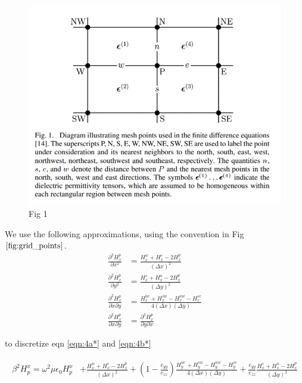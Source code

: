 \documentclass[letter]{article}
\newcommand{\Partialsqx}[1]{\frac{\partial^2 #1}{\partial x^2}}
\newcommand{\Partialsqy}[1]{\frac{\partial^2 #1}{\partial y^2}}
\begin{document}
	
	\begin{figure}[h]
		\centering
		\includegraphics[scale=0.5]{grid.png}
		\caption{Fig 1}
		\label{fig:grid_points}
	\end{figure}
	
	We use the following approximations, using the convention in Fig $\ref{fig:grid_points}$.
	\begin{align*}
		\Partialsqx{H_x^p} &= \frac{H_x^w + H_x^e - 2H_x^p}{(\Delta x)^2} \\
		\Partialsqy{H_x^p} &= \frac{H_x^s + H_x^n - 2H_x^p}{(\Delta y)^2} \\
		\frac{\partial^2 H_x^p}{\partial x \partial y} &= \frac{H_x^{ne} + H_x^{sw} - H_x^{nw} - 
															H_x^{se}}{4(\Delta x)(\Delta y)}\\
		\frac{\partial^2 H_x^p}{\partial x \partial y} &= \frac{\partial^2 H_x^p}{\partial y \partial x}
	\end{align*}
	
	to discretize eqn \ref{eqn:4a*} and \ref{eqn:4b*}
	 
	\begin{align}
	\begin{split}
		\beta^2 H^x_p = \omega^2 \mu \epsilon_0 H^x_p &+ \frac{H_x^w + H_x^e - 2H_x^p}{(\Delta x)^2} + (1 - \frac{e_{yy}}{e_{zz}}) \frac{H_y^{ne} + H_y^{sw} - H_y^{nw} - H_y^{se}}{4(\Delta x)(\Delta y)} + \frac{e_{yy}}{e_{zz}} \frac{H_x^s + H_x^n - 2H_x^p}{(\Delta y)^2} 
		\label{eqn:4a_descrete}		
		\end{split}
	\end{align}
	
\end{document}

